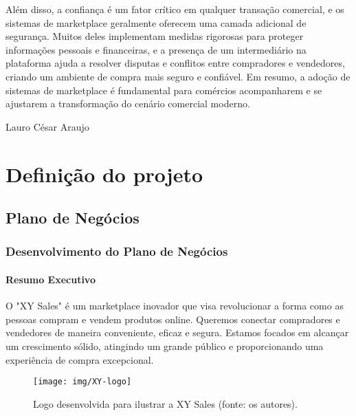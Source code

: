 \documentclass[
	12pt,				%
	openright,			%
	twoside,			%
	a4paper,			%
	english,			%
	brazil				%
	]{abntex2}
\begin{document}
Além disso, a confiança é um fator crítico em qualquer transação comercial, e os sistemas de marketplace geralmente oferecem uma camada adicional de segurança. Muitos deles implementam medidas rigorosas para proteger informações pessoais e financeiras, e a presença de um intermediário na plataforma ajuda a resolver disputas e conflitos entre compradores e vendedores, criando um ambiente de compra mais seguro e confiável. Em resumo, a adoção de sistemas de marketplace é fundamental para comércios acompanharem e se ajustarem a transformação do cenário comercial moderno.


Lauro César Araujo

\part{Definição do projeto}



\chapter{Plano de Negócios}\label{cap_plano_de_negocios}

\section{Desenvolvimento do Plano de Negócios}

\subsection{Resumo Executivo}

O "XY Sales" é um marketplace inovador que visa revolucionar a forma como as pessoas compram e vendem produtos online. Queremos conectar compradores e vendedores de maneira conveniente, eficaz e segura. Estamos focados em alcançar um crescimento sólido, atingindo um grande público e proporcionando uma experiência de compra excepcional.

\begin{figure}[htb]
	\centering
	\texttt{[image: img/XY-logo]}
	\caption{Logo desenvolvida para ilustrar a XY Sales (fonte: os autores).}
	\label{fig:logo-geekstore}
\end{figure}
\end{document}
